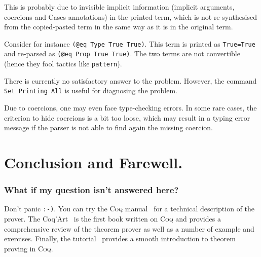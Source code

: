 \documentclass[a4paper,pdftex]{article}
\def\Question#1{\stepcounter{question}\subsubsection{#1}}
\def\Coq{\textsc{Coq}}
\begin{document}
 This is probably due to invisible implicit information (implicit
arguments, coercions and Cases annotations) in the printed term, which
is not re-synthesised from the copied-pasted term in the same way as
it is in the original term.

  Consider for instance {\tt (@eq Type True True)}. This term is
printed as {\tt True=True} and re-parsed as {\tt (@eq Prop True
True)}. The two terms are not convertible (hence they fool tactics
like {\tt pattern}).

  There is currently no satisfactory answer to the problem. However,
the command {\tt Set Printing All} is useful for diagnosing the
problem.
 
  Due to coercions, one may even face type-checking errors. In some
rare cases, the criterion to hide coercions is a bit too loose, which
may result in a typing error message if the parser is not able to find
again the missing coercion.



\section{Conclusion and Farewell.}
\label{ccl}

\Question{What if my question isn't answered here?} 
\label{lastquestion}

Don't panic \verb+:-)+. You can try the {\Coq} manual~\cite{Coq:manual} for a technical
description of the prover. The Coq'Art~\cite{Coq:coqart} is the first
book written on {\Coq} and provides a comprehensive review of the
theorem prover as well as a number of example and exercises. Finally,
the tutorial~\cite{Coq:Tutorial} provides a smooth introduction to
theorem proving in \Coq.


\newpage
\nocite{LaTeX:intro}
\nocite{LaTeX:symb}


\typeout{*********************************************}
\typeout{*********************************************}
\end{document}
